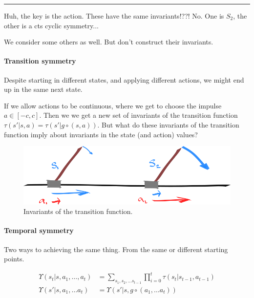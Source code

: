 \begin{center}\rule{0.5\linewidth}{\linethickness}\end{center}


{\color{red}Huh, the key is the action. These have the same invariants!??! No. One is $S_2$, the other is a cts cyclic symmetry...}

We consider some others as well. But don't construct their invariants.

\paragraph{Transition symmetry}

Despite starting in different states, and applying different actions, we might end up in the same next state.

If we allow actions to be continuous, where we get to choose the impulse $a \in [-c, c]$.
Then we we get a new set of invariants of the transition function $\tau(s'|s, a) = \tau(s'|g\circ (s, a))$.
But what do these invariants of the transition function imply about invariants in the state (and action) values?

\begin{figure}[!h]
\centering
\includegraphics[width=1\textwidth,height=0.25\textheight]{../../pictures/drawings/cart-pole-state.png}
\caption{Invariants of the transition function.}
\end{figure}


\paragraph{Temporal symmetry}

Two ways to achieving the same thing. From the same or different starting points.

\begin{align*}
\Upsilon(s_t | s, a_1, \dots, a_t) &= \sum_{s_1, s_2, \dots s_{t-1}}\prod_{i=0}^t \tau(s_t| s_{t-1}, a_{t-1}) \\
\Upsilon(s' | s, a_1, \dots a_t) &= \Upsilon(s' | s, g\circ (a_1, \dots a_t)) \\
\end{align*}

